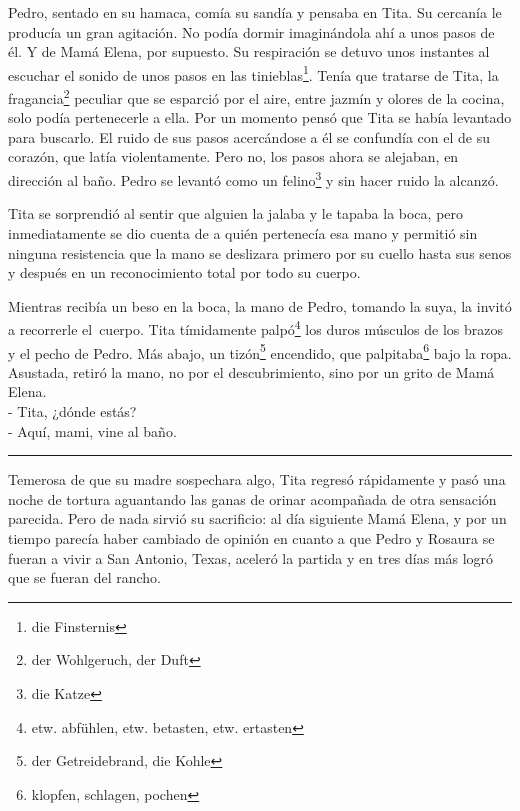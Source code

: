 Pedro, sentado en su hamaca, comía su sandía y pensaba en Tita. Su
cercanía le producía un gran agitación. No podía dormir imaginándola ahí
a unos pasos de él. Y de Mamá Elena, por supuesto. Su respiración se
detuvo unos instantes al escuchar el sonido de unos pasos en las tinieblas\footnote{die Finsternis}. Tenía que tratarse de
Tita, la fragancia\footnote{der Wohlgeruch, der Duft}
peculiar que se esparció
por el aire, entre jazmín y olores de la cocina, solo podía
pertenecerle a ella. Por un momento pensó que Tita se había levantado
para buscarlo. El ruido de sus pasos acercándose a él se confundía con
el de su corazón, que latía violentamente. Pero no, los pasos ahora se
alejaban, en dirección al baño. Pedro se levantó como un felino\footnote{die Katze}
y sin hacer ruido la alcanzó.

Tita se sorprendió al sentir que alguien la jalaba y le tapaba la boca,
pero inmediatamente se dio cuenta de a quién pertenecía esa mano y
permitió sin ninguna resistencia que la mano se deslizara primero por su
cuello hasta sus senos y después en un reconocimiento total por todo su
cuerpo.

Mientras recibía un beso en la boca, la mano de Pedro, tomando la suya,
la invitó a recorrerle el~cuerpo. Tita tímidamente palpó\footnote{etw. abfühlen, etw. betasten, etw. ertasten}
los duros músculos de los brazos y el pecho de Pedro. Más abajo, un tizón\footnote{der Getreidebrand, die Kohle}
encendido, que palpitaba\footnote{klopfen, schlagen, pochen}
bajo la ropa. Asustada, retiró la mano, no por el descubrimiento, sino por
un grito de Mamá Elena.
\\- Tita, ¿dónde estás? %
\\- Aquí, mami, vine al baño. \\
\rule{1em}{0pt}Temerosa de que su madre sospechara algo, Tita regresó rápidamente y
pasó una noche de tortura aguantando las ganas de orinar acompañada de
otra sensación parecida. Pero de nada sirvió su sacrificio: al día
siguiente Mamá Elena, y por un tiempo parecía haber cambiado de opinión
en cuanto a que Pedro y Rosaura se fueran a vivir a San Antonio, Texas,
aceleró la partida y en tres días más logró que se fueran del rancho.

